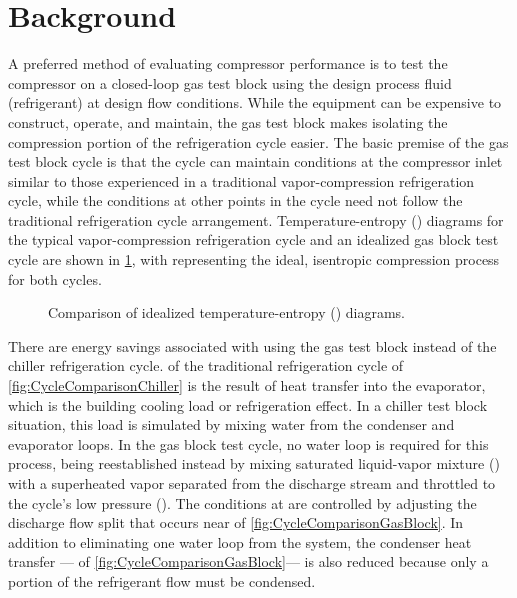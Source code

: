 \section{Background} \label{sec:background}
A preferred method of evaluating compressor performance is to test the compressor on a closed-loop gas test block
using the design process fluid (refrigerant) at design flow conditions. 
While the equipment can be expensive to construct, operate, and maintain, 
the gas test block makes isolating the compression portion of the refrigeration cycle easier. 
The basic premise of the gas test block cycle is that 
the cycle can maintain conditions at the compressor inlet similar to those experienced in a traditional vapor-compression refrigeration cycle, 
while the conditions at other points in the cycle need not follow the traditional refrigeration cycle arrangement. 
Temperature-entropy (\tssymb)%
%
diagrams for the typical vapor-compression refrigeration cycle 
and an idealized gas block test cycle are shown in \cref{fig:CycleComparison},
with  representing the ideal, isentropic compression process for both cycles. 
\begin{figure}[htbp]
  \centering
  \hfill
  \caption{Comparison of idealized temperature-entropy (\tssymb) diagrams.}
  \label{fig:CycleComparison}
\end{figure}

There are energy savings associated with using the gas test block 
instead of the chiller refrigeration cycle. 
 of the traditional refrigeration cycle of \cref{fig:CycleComparisonChiller} 
is the result of heat transfer into the evaporator, 
which is the building cooling load or refrigeration effect. 
In a chiller test block situation, this load is simulated 
by mixing water from the condenser and evaporator loops. 
In the gas block test cycle, no water loop is required for this process, 
 being reestablished instead by mixing saturated liquid-vapor mixture () 
with a superheated vapor separated from the discharge stream and throttled to the cycle's low pressure (). 
The conditions at  are controlled by adjusting 
the discharge flow split that occurs near  of \cref{fig:CycleComparisonGasBlock}. 
In addition to eliminating one water loop from the system, the condenser heat transfer%
--- of \cref{fig:CycleComparisonGasBlock}---%
is also reduced because only a portion of the refrigerant flow must be condensed.

